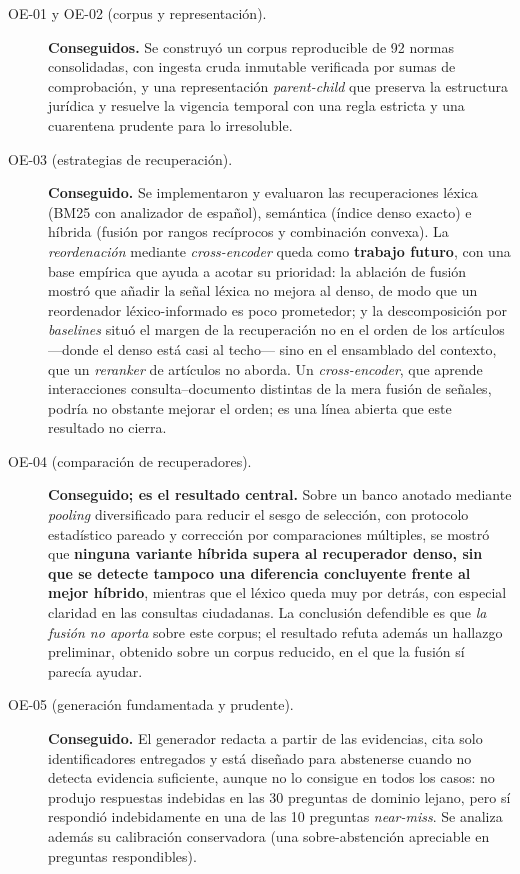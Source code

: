 \begin{description}
  \item[OE-01 y OE-02 (corpus y representación).] \textbf{Conseguidos.} Se construyó un corpus reproducible de 92 normas consolidadas, con ingesta cruda inmutable verificada por sumas de comprobación, y una representación \emph{parent-child} que preserva la estructura jurídica y resuelve la vigencia temporal con una regla estricta y una cuarentena prudente para lo irresoluble.

  \item[OE-03 (estrategias de recuperación).] \textbf{Conseguido.} Se implementaron y evaluaron las recuperaciones léxica (BM25 con analizador de español), semántica (índice denso exacto) e híbrida (fusión por rangos recíprocos y combinación convexa). La \emph{reordenación} mediante \emph{cross-encoder} queda como \textbf{trabajo futuro}, con una base empírica que ayuda a acotar su prioridad: la ablación de fusión mostró que añadir la señal léxica no mejora al denso, de modo que un reordenador léxico-informado es poco prometedor; y la descomposición por \emph{baselines} situó el margen de la recuperación no en el orden de los artículos —donde el denso está casi al techo— sino en el ensamblado del contexto, que un \emph{reranker} de artículos no aborda. Un \emph{cross-encoder}, que aprende interacciones consulta--documento distintas de la mera fusión de señales, podría no obstante mejorar el orden; es una línea abierta que este resultado no cierra.

  \item[OE-04 (comparación de recuperadores).] \textbf{Conseguido; es el resultado central.} Sobre un banco anotado mediante \emph{pooling} diversificado para reducir el sesgo de selección, con protocolo estadístico pareado y corrección por comparaciones múltiples, se mostró que \textbf{ninguna variante híbrida supera al recuperador denso, sin que se detecte tampoco una diferencia concluyente frente al mejor híbrido}, mientras que el léxico queda muy por detrás, con especial claridad en las consultas ciudadanas. La conclusión defendible es que \emph{la fusión no aporta} sobre este corpus; el resultado refuta además un hallazgo preliminar, obtenido sobre un corpus reducido, en el que la fusión sí parecía ayudar.

  \item[OE-05 (generación fundamentada y prudente).] \textbf{Conseguido.} El generador redacta a partir de las evidencias, cita solo identificadores entregados y está diseñado para abstenerse cuando no detecta evidencia suficiente, aunque no lo consigue en todos los casos: no produjo respuestas indebidas en las 30 preguntas de dominio lejano, pero sí respondió indebidamente en una de las 10 preguntas \emph{near-miss}. Se analiza además su calibración conservadora (una sobre-abstención apreciable en preguntas respondibles).


\end{description}

